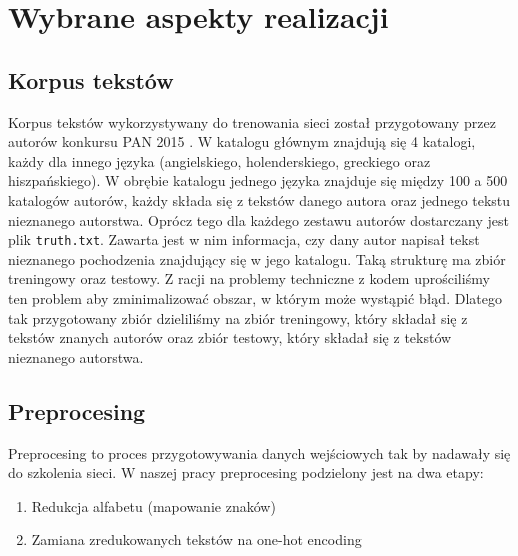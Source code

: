 \newpage
\section{Wybrane aspekty realizacji}

\subsection{Korpus tekstów}
Korpus tekstów wykorzystywany do trenowania sieci został przygotowany przez autorów konkursu PAN 2015 \cite{pan}.
W katalogu głównym znajdują się 4 katalogi, każdy dla innego języka (angielskiego, holenderskiego, greckiego oraz hiszpańskiego).
W obrębie katalogu jednego języka znajduje się między 100 a 500 katalogów autorów, każdy składa się z tekstów danego autora oraz jednego
tekstu nieznanego autorstwa. Oprócz tego dla każdego zestawu autorów dostarczany jest plik \texttt{truth.txt}.
Zawarta jest w nim informacja, czy dany autor napisał tekst nieznanego pochodzenia znajdujący się w jego katalogu.
Taką strukturę ma zbiór treningowy oraz testowy. Z racji na problemy techniczne z kodem uprościliśmy ten problem 
aby zminimalizować obszar, w którym może wystąpić błąd. Dlatego tak przygotowany zbiór dzieliliśmy na zbiór treningowy, który
składał się z tekstów znanych autorów oraz zbiór testowy, który składał się z tekstów nieznanego autorstwa. 

\myspace
{}
\myspace

\subsection{Preprocesing}
Preprocesing to proces przygotowywania danych wejściowych tak by nadawały się do szkolenia sieci.
W naszej pracy preprocesing podzielony jest na dwa etapy:
\begin{enumerate}
	\item Redukcja alfabetu (mapowanie znaków)
	\item Zamiana zredukowanych tekstów na one-hot encoding
\end{enumerate}

